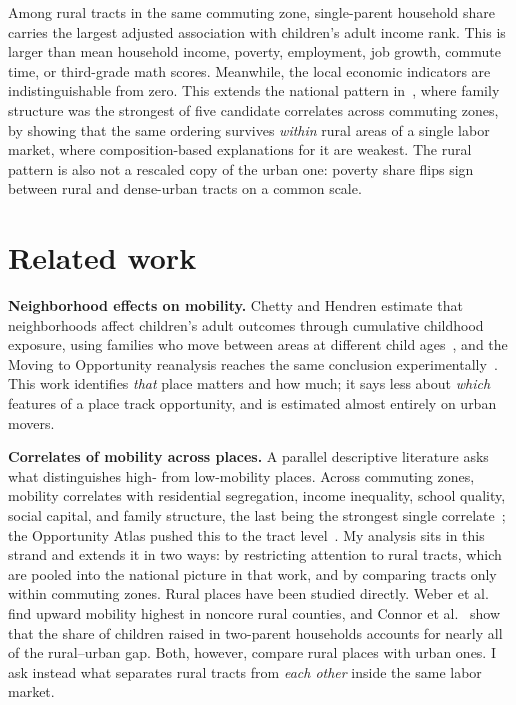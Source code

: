 \documentclass[9pt,twoside]{pnas-new}
\begin{document}
Among rural tracts in the same commuting zone, single-parent household share
carries the largest adjusted association with children's adult income rank.
This is larger than mean household income, poverty, employment, job growth,
commute time, or third-grade math scores. Meanwhile, the local economic
indicators are indistinguishable from zero. This extends the
national pattern in~\cite{chetty2014land}, where family structure was the
strongest of five candidate correlates across commuting zones, by showing that
the same ordering survives \emph{within} rural areas of a single labor market,
where composition-based explanations for it are weakest. The rural pattern is
also not a rescaled copy of the urban one: poverty share flips sign between
rural and dense-urban tracts on a common scale.

\section{Related work}

\noindent\textbf{Neighborhood effects on mobility.} Chetty and Hendren estimate that
neighborhoods affect children's adult outcomes through cumulative childhood
exposure, using families who move between areas at different child
ages~\cite{chetty2017exposure,chetty2018county}, and the Moving to Opportunity
reanalysis reaches the same conclusion experimentally~\cite{chetty2015mto}.
This work identifies \emph{that} place matters and how much; it says less about
\emph{which} features of a place track opportunity, and is estimated almost
entirely on urban movers.

\noindent\textbf{Correlates of mobility across places.} A parallel descriptive
literature asks what distinguishes high- from low-mobility places. Across
commuting zones, mobility correlates with residential segregation, income
inequality, school quality, social capital, and family structure, the last
being the strongest single correlate~\cite{chetty2014land}; the Opportunity
Atlas pushed this to the tract level~\cite{chetty2018atlas}. My analysis sits
in this strand and extends it in two ways: by restricting attention to rural
tracts, which are pooled into the national picture in that work, and by
comparing tracts only within commuting zones. Rural places have been studied
directly. Weber et al.~\cite{weber2017rural} find upward mobility highest in
noncore rural counties, and Connor et al.~\cite{connor2023rural} show that
the share of children raised in two-parent households accounts for nearly all
of the rural--urban gap. Both, however, compare rural places with urban ones.
I ask
instead what separates rural tracts from \emph{each other} inside the same
labor market.
\end{document}
